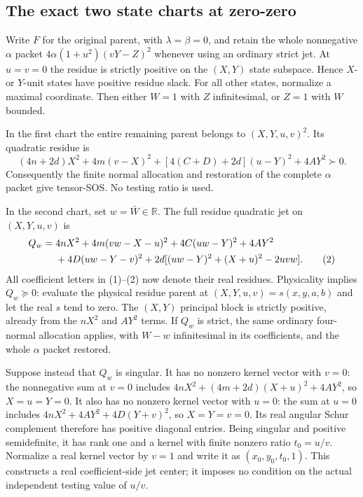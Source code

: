 \subsection*{The exact two state charts at zero-zero}

Write $F$ for the original parent, with $\lambda=\beta=0$, and retain
the whole nonnegative $\alpha$ packet
$4\alpha(1+u^2)(vY-Z)^2$ whenever using an ordinary strict jet.
At $u=v=0$ the residue is strictly positive on the $(X,Y)$ state
subspace. Hence $X$- or $Y$-unit states have positive residue slack.
For all other states, normalize a maximal coordinate. Then either
$W=1$ with $Z$ infinitesimal, or $Z=1$ with $W$ bounded.

In the first chart the entire remaining parent belongs to
$(X,Y,u,v)^2$. Its quadratic residue is
\begin{equation}
 (4n+2d)X^2+4m(v-X)^2+[4(C+D)+2d](u-Y)^2+4AY^2\succ0. \tag{1}
\end{equation}
Consequently the finite normal allocation and restoration of the
complete $\alpha$ packet give tensor-SOS. No testing ratio is used.

In the second chart, set $w=\bar W\in\mathbb R$. The full residue
quadratic jet on $(X,Y,u,v)$ is
\begin{align}
 Q_w={}&4nX^2+4m(vw-X-u)^2+4C(uw-Y)^2+4AY^2\notag\\
      &+4D(uw-Y-v)^2
        +2d[(uw-Y)^2+(X+u)^2-2uvw].                    \tag{2}
\end{align}
All coefficient letters in (1)--(2) now denote their real residues.
Physicality implies $Q_w\succeq0$: evaluate the physical residue
parent at $(X,Y,u,v)=s(x,y,a,b)$ and let the real $s$ tend to zero.
The $(X,Y)$ principal block is strictly positive, already from the
$nX^2$ and $AY^2$ terms. If $Q_w$ is strict, the same ordinary
four-normal allocation applies, with $W-w$ infinitesimal in its
coefficients, and the whole $\alpha$ packet restored.

Suppose instead that $Q_w$ is singular. It has no nonzero kernel
vector with $v=0$: the nonnegative sum at $v=0$ includes
$4nX^2+(4m+2d)(X+u)^2+4AY^2$, so $X=u=Y=0$.
It also has no nonzero kernel vector with $u=0$: the sum at $u=0$
includes $4nX^2+4AY^2+4D(Y+v)^2$, so $X=Y=v=0$.
Its real angular Schur complement therefore has positive diagonal
entries. Being singular and positive semidefinite, it has rank one
and a kernel with finite nonzero ratio $t_0=u/v$. Normalize a real
kernel vector by $v=1$ and write it as $(x_0,y_0,t_0,1)$.
This constructs a real coefficient-side jet center; it imposes no
condition on the actual independent testing value of $u/v$.

